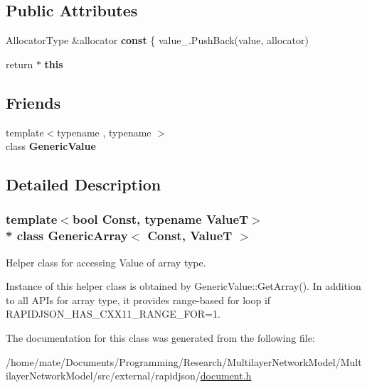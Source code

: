 \subsection*{Public Attributes}
\begin{DoxyCompactItemize}
\item 
Allocator\+Type \&allocator {\bfseries const} \{ value\+\_\+.\+Push\+Back(value, allocator)\hypertarget{classGenericArray_a25d2ed55daa117c41db6a5b3f87e9ddc}{}\label{classGenericArray_a25d2ed55daa117c41db6a5b3f87e9ddc}

\item 
return $\ast$ {\bfseries this}\hypertarget{classGenericArray_aef8b7baa9ec5cd68d8951fa8bad85217}{}\label{classGenericArray_aef8b7baa9ec5cd68d8951fa8bad85217}

\end{DoxyCompactItemize}
\subsection*{Friends}
\begin{DoxyCompactItemize}
\item 
{\footnotesize template$<$typename , typename $>$ }\\class {\bfseries Generic\+Value}\hypertarget{classGenericArray_a899449e1a645b5e377af059fb61113d8}{}\label{classGenericArray_a899449e1a645b5e377af059fb61113d8}

\end{DoxyCompactItemize}


\subsection{Detailed Description}
\subsubsection*{template$<$bool Const, typename ValueT$>$\\*
class Generic\+Array$<$ Const, Value\+T $>$}

Helper class for accessing Value of array type. 

Instance of this helper class is obtained by {\ttfamily Generic\+Value\+::\+Get\+Array()}. In addition to all A\+P\+Is for array type, it provides range-\/based for loop if {\ttfamily R\+A\+P\+I\+D\+J\+S\+O\+N\+\_\+\+H\+A\+S\+\_\+\+C\+X\+X11\+\_\+\+R\+A\+N\+G\+E\+\_\+\+F\+OR=1}. 

The documentation for this class was generated from the following file\+:\begin{DoxyCompactItemize}
\item 
/home/mate/\+Documents/\+Programming/\+Research/\+Multilayer\+Network\+Model/\+Multilayer\+Network\+Model/src/external/rapidjson/\hyperlink{document_8h}{document.\+h}\end{DoxyCompactItemize}
